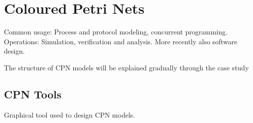 \section{Coloured Petri Nets}

Common usage: Process and protocol modeling, concurrent programming. Operations:
Simulation, verification and analysis. More recently also software design.

The structure of CPN models will be explained gradually through the case study 

\subsection{CPN Tools}

Graphical tool used to design CPN models. 

\begin{comment}

\subsection{CPN ML}
	


		
		The simple types available are unit, boolean, integer, string, enumerated
		and index. A unit can have one value: \lstinline:():. Enumerated colour sets
		can have specified values, while index colour sets define an indexed range of
		values. 
		
		The compound types are:
		\begin{description}
		\item[Product] A combination of colour sets separated by \lstinline:*:. The
		postal code and city example from earlier would be
		\lstinline:product INT*STRING:, and a colour would be (5055,''Bergen'');
		\item[List] A list of items that belong to the same colour set.
		\item[Record] Similar to a product, but each element is named. The postal code
		and city example would give \lstinline-record Code:INT*City:STRING- and a
		colour would be \lstinline:{Code=5055,City="Bergen"}:
		\item[Union] This is used if a place should be able to contain colours from
		different colour sets, or if such colours should be handled in the same way at a
		point in the model. They can also contain simple identifiers, like an
		enumeration. An example is shown in Listing \ref{lst:overview_colset}.
		\end{description}
		
		For full syntax definition, please refer to the CPN Tools
		documentation. (ref?)

\end{comment}
